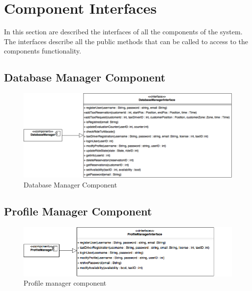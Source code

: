 \documentclass[../../../../dd.tex]{subfiles}
\begin{document}
	\section{Component Interfaces}
	In this section are described the interfaces of all the components of the system. The interfaces describe all the public methods that can be called to access to the components functionality.
		
		\subsection{Database Manager Component}
		\begin{figure}[H]
				\centering
				\includegraphics[width=\textwidth, scale=0.5]{../images/DatabaseManagerComponent.png}
			\caption{Database Manager Component}\label{fig:DBMSC}
		\end{figure}
		
		\subsection{Profile Manager Component}
		\begin{figure}[H]
				\centering
				\includegraphics[width=\textwidth, scale=0.5]{../images/ProfileManagerComponent.png}
			\caption{Profile manager component}\label{fig:PMC}
		\end{figure}
		
\end{document}
